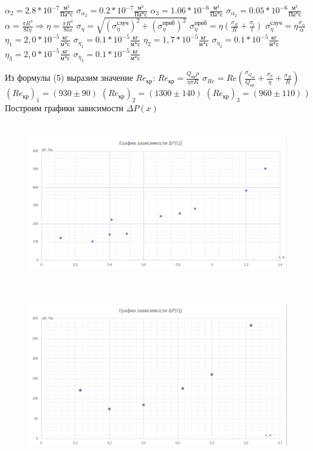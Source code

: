\documentclass[12pt,a4paper]{article}
\begin{document}
$\alpha_{2}=2.8*10^{-7}\frac{\text{м}^3}{\text{Па*с}}$ \;\;\;\;\;\;\;\;\;\; $\sigma_{\alpha_{2}}=0.2*10^{-7}\frac{\text{м}^3}{\text{Па*с}}$ \hfill \break
$\alpha_{3}=1.06*10^{-6}\frac{\text{м}^3}{\text{Па*с}}$ \;\;\;\;\;\;\;\;\; $\sigma_{\alpha_{2}}=0.05*10^{-6}\frac{\text{м}^3}{\text{Па*с}}$ \hfill \break
$\alpha=\frac{\pi{R^4}}{8l\eta}\Rightarrow\eta=\frac{\pi{R^4}}{8l\alpha}$\hfill \break
$\sigma_{\eta}=\sqrt{(\sigma^{\text{случ}}_{\eta})^2+(\sigma^{\text{приб}}_{\eta})^2}$ \hfill \break
$\sigma^{\text{приб}}_{\eta}=\eta(\frac{\sigma_{R}}{R}+\frac{\sigma_{l}}{l})$\;\;\;\;\;\;\;\;\;\; $\sigma^{\text{случ}}_{\eta}=\eta\frac{\sigma_{\alpha}}{\alpha}$ \hfill \break
$\eta_{1}=2,0*10^{-5}\frac{\text{кг}}{\text{м*с}}$ \;\;\;\;\;\;\;\;\;\; $\sigma_{\eta_{1}}=0.1*10^{-5}\frac{\text{кг}}{\text{м*с}}$ \hfill \break
$\eta_{2}=1,7*10^{-5}\frac{\text{кг}}{\text{м*с}}$ \;\;\;\;\;\;\;\;\;\; $\sigma_{\eta_{2}}=0.1*10^{-5}\frac{\text{кг}}{\text{м*с}}$ \hfill \break
$\eta_{3}=2,0*10^{-5}\frac{\text{кг}}{\text{м*с}}$ \;\;\;\;\;\;\;\;\;\; $\sigma_{\eta_{3}}=0.1*10^{-5}\frac{\text{кг}}{\text{м*с}}$
\par Из формулы (5) выразим значение $Re_{\text{кр}}$: $Re_{\text{кр}}=\frac{Q_{\text{кр}}\rho}{\eta\pi{R}}$ \hfill \break
$\sigma_{Re}=Re(\frac{\sigma_{Q_{\text{кр}}}}{Q_{\text{кр}}}+\frac{\sigma_{\eta}}{\eta}+\frac{\sigma_{R}}{R})$ \hfill \break
$(Re_{\text{кр}})_{1}=(930 \pm 90)$ \hfill \break
$(Re_{\text{кр}})_{2}=(1300 \pm 140)$ \hfill \break
$(Re_{\text{кр}})_{3}=(960 \pm 110)$ \hfill {}) Построим графики зависимости $\Delta{P}(x)$
\begin{figure}[H]
\centering
\includegraphics[width=14cm, height=7cm]{1.3.3_gr_4}
\end{figure}
\begin{figure}[H]
\centering
\includegraphics[width=14cm, height=7cm]{1.3.3_gr_5}
\end{figure}
\end{document}
